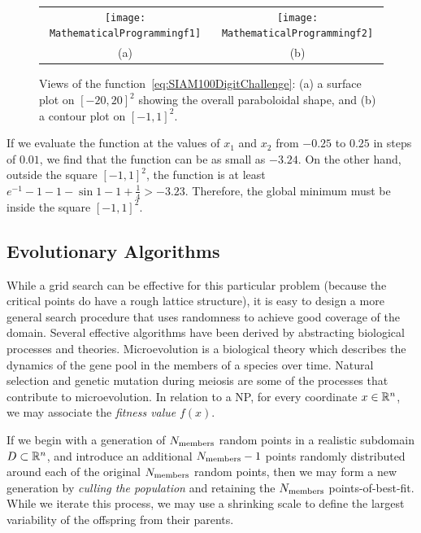 \begin{figure}[htbp]
\begin{center}
\begin{tabular}{cc}
\hspace*{-0.5cm}\texttt{[image: MathematicalProgrammingf1]}&
\hspace*{-0.5cm}\texttt{[image: MathematicalProgrammingf2]}\\
(a) & (b)\\
\end{tabular}
\caption{Views of the function~\eqref{eq:SIAM100DigitChallenge}: (a) a surface plot on $[-20,20]^2$ showing the overall paraboloidal shape, and (b) a contour plot on $[-1,1]^2$.}
\label{figure:MathProgf}
\end{center}
\end{figure}

If we evaluate the function at the values of $x_1$ and $x_2$ from $-0.25$ to $0.25$ in steps of $0.01$, we find that the function can be as small as $-3.24$. On the other hand, outside the square $[-1,1]^2$, the function is at least $e^{-1}-1-1-\sin1-1+\frac{1}{4} > -3.23$. Therefore, the global minimum must be inside the square $[-1,1]^2$.

\subsection{Evolutionary Algorithms}

While a grid search can be effective for this particular problem (because the critical points do have a rough lattice structure), it is easy to design a more general search procedure that uses randomness to achieve good coverage of the domain. Several effective algorithms have been derived by abstracting biological processes and theories. Microevolution is a biological theory which describes the dynamics of the gene pool in the members of a species over time. Natural selection and genetic mutation during meiosis are some of the processes that contribute to microevolution. In relation to a NP, for every coordinate $x\in\mathbb{R}^n$, we may associate the {\em fitness value} $f(x)$.

If we begin with a generation of $N_{\rm members}$ random points in a realistic subdomain $D\subset\mathbb{R}^n$, and introduce an additional $N_{\rm members} -1$ points randomly distributed around each of the original $N_{\rm members}$ random points, then we may form a new generation by {\em culling the population} and retaining the $N_{\rm members}$ points-of-best-fit. While we iterate this process, we may use a shrinking scale to define the largest variability of the offspring from their parents.

